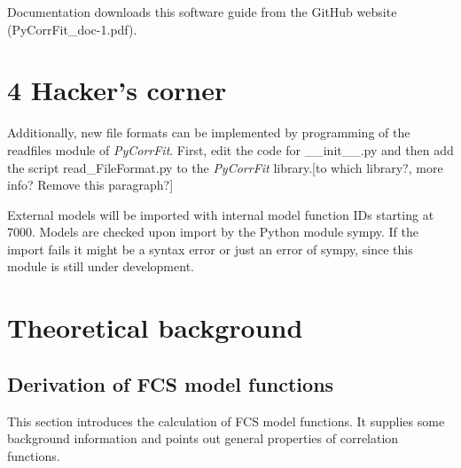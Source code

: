 Documentation downloads this software guide from the GitHub website (PyCorrFit\_doc-1.pdf).

\section{4 Hacker's corner}

Additionally, new file formats can be implemented by programming of the readfiles module of \textit{PyCorrFit}. First, edit the code for \_\_init\_\_.py and then add the script read\_FileFormat.py to the \textit{PyCorrFit} library.[to which library?, more info? Remove this paragraph?] 

External models will be imported with internal model function IDs starting at 7000. Models are checked upon import by the Python module sympy. If the import fails it might be a syntax error or just an error of sympy, since this module is still under development. 



\section{Theoretical background}


\subsection{Derivation of FCS model functions}
This section introduces the calculation of FCS model functions. It supplies some background information and points out general properties of correlation functions.
	
